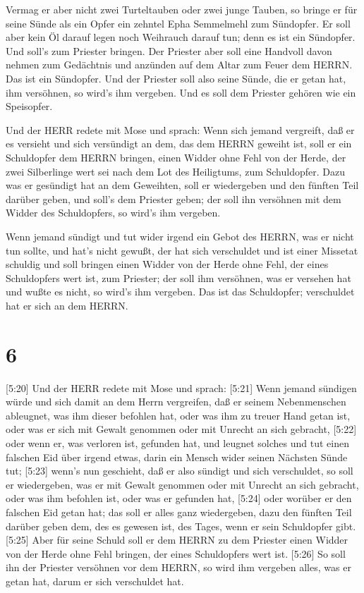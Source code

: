  Vermag er aber nicht zwei Turteltauben oder zwei junge
Tauben, so bringe er für seine Sünde als ein Opfer ein zehntel Epha
Semmelmehl zum Sündopfer. Er soll aber kein Öl darauf legen noch
Weihrauch darauf tun; denn es ist ein Sündopfer.  Und
soll's zum Priester bringen. Der Priester aber soll eine Handvoll davon
nehmen zum Gedächtnis und anzünden auf dem Altar zum Feuer dem HERRN.
Das ist ein Sündopfer.  Und der Priester soll also seine
Sünde, die er getan hat, ihm versöhnen, so wird's ihm vergeben. Und es
soll dem Priester gehören wie ein Speisopfer.

 Und der HERR redete mit Mose und sprach: 
Wenn sich jemand vergreift, daß er es versieht und sich versündigt an
dem, das dem HERRN geweiht ist, soll er ein Schuldopfer dem HERRN
bringen, einen Widder ohne Fehl von der Herde, der zwei Silberlinge wert
sei nach dem Lot des Heiligtums, zum Schuldopfer.  Dazu was
er gesündigt hat an dem Geweihten, soll er wiedergeben und den fünften
Teil darüber geben, und soll's dem Priester geben; der soll ihn
versöhnen mit dem Widder des Schuldopfers, so wird's ihm vergeben.

 Wenn jemand sündigt und tut wider irgend ein Gebot des
HERRN, was er nicht tun sollte, und hat's nicht gewußt, der hat sich
verschuldet und ist einer Missetat schuldig  und soll
bringen einen Widder von der Herde ohne Fehl, der eines Schuldopfers
wert ist, zum Priester; der soll ihm versöhnen, was er versehen hat und
wußte es nicht, so wird's ihm vergeben.  Das ist das
Schuldopfer; verschuldet hat er sich an dem HERRN.

\hypertarget{section-5}{%
\section{6}\label{section-5}}

 {[}5:20{]} Und der HERR redete mit Mose und sprach:
 {[}5:21{]} Wenn jemand sündigen würde und sich damit an dem
Herrn vergreifen, daß er seinem Nebenmenschen ableugnet, was ihm dieser
befohlen hat, oder was ihm zu treuer Hand getan ist, oder was er sich
mit Gewalt genommen oder mit Unrecht an sich gebracht, 
{[}5:22{]} oder wenn er, was verloren ist, gefunden hat, und leugnet
solches und tut einen falschen Eid über irgend etwas, darin ein Mensch
wider seinen Nächsten Sünde tut;  {[}5:23{]} wenn's nun
geschieht, daß er also sündigt und sich verschuldet, so soll er
wiedergeben, was er mit Gewalt genommen oder mit Unrecht an sich
gebracht, oder was ihm befohlen ist, oder was er gefunden hat,
 {[}5:24{]} oder worüber er den falschen Eid getan hat; das
soll er alles ganz wiedergeben, dazu den fünften Teil darüber geben dem,
des es gewesen ist, des Tages, wenn er sein Schuldopfer gibt.
 {[}5:25{]} Aber für seine Schuld soll er dem HERRN zu dem
Priester einen Widder von der Herde ohne Fehl bringen, der eines
Schuldopfers wert ist.  {[}5:26{]} So soll ihn der Priester
versöhnen vor dem HERRN, so wird ihm vergeben alles, was er getan hat,
darum er sich verschuldet hat.

